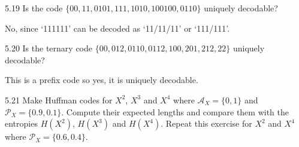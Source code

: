 \documentclass[12pt, a4paper]{article}
\begin{document}
\begin{prob}{5.19}
Is the code $\{00, 11, 0101, 111, 1010, 100100, 0110\}$ uniquely decodable?
\end{prob}
\begin{sol}
No, since `111111' can be decoded as `11/11/11' or `111/111'.
\end{sol}
\bigskip


\begin{prob}{5.20}
Is the ternary code $\{00, 012, 0110, 0112, 100, 201, 212, 22\}$ uniquely decodable?
\end{prob}
\begin{sol}
This is a prefix code so yes, it is uniquely decodable.
\end{sol}
\bigskip

\begin{prob}{5.21}
     Make Huffman codes for $X^2$, $X^3$ and $X^4$ where $\mathcal{A}_X = \{0, 1\}$ and $\mathcal{P}_X = \{0.9, 0.1\}$.
     Compute their expected lengths and compare them with the entropies $H(X^2)$, $H(X^3)$ and $H(X^4)$.
     \noindent Repeat this exercise for $X^2$ and $X^4$ where $\mathcal{P}_X = \{0.6, 0.4\}$.
\end{prob}
\end{document}
